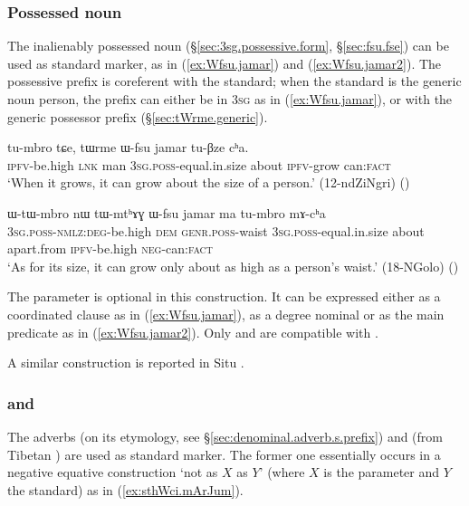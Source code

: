 \subsubsection{Possessed noun} \label{sec:Wfsu.equative}
The inalienably possessed noun   (§\ref{sec:3sg.possessive.form}, §\ref{sec:fsu.fse}) can be used as standard marker, as in (\ref{ex:Wfsu.jamar}) and (\ref{ex:Wfsu.jamar2}). The possessive prefix is coreferent with the standard; when the standard is the generic noun  {person}, the prefix can either be in \textsc{3sg} as in (\ref{ex:Wfsu.jamar}), or with the generic possessor prefix (§\ref{sec:tWrme.generic}).

\begin{exe}
\ex \label{ex:Wfsu.jamar}
\gll tu-mbro tɕe, tɯrme ɯ-fsu jamar tu-βze cʰa. \\
\textsc{ipfv}-be.high \textsc{lnk}  man \textsc{3sg}.\textsc{poss}-equal.in.size about \textsc{ipfv}-grow can:\textsc{fact} \\
\glt `When it grows, it can grow about the size of a person.' (12-ndZiNgri)
()
\end{exe}

\begin{exe}
\ex \label{ex:Wfsu.jamar2}
\gll ɯ-tɯ-mbro nɯ tɯ-mtʰɤɣ ɯ-fsu jamar ma tu-mbro mɤ-cʰa \\
\textsc{3sg}.\textsc{poss}-\textsc{nmlz}:\textsc{deg}-be.high \textsc{dem} \textsc{genr}.\textsc{poss}-waist \textsc{3sg}.\textsc{poss}-equal.in.size about apart.from \textsc{ipfv}-be.high \textsc{neg}-can:\textsc{fact} \\
\glt `As for its size, it can grow only about as high as a person's waist.' (18-NGolo)
()
\end{exe}

The parameter is optional in this construction. It can be expressed either as a coordinated clause as in (\ref{ex:Wfsu.jamar}), as a degree nominal or as the main predicate as in (\ref{ex:Wfsu.jamar2}). Only  and  are compatible with .

A similar construction is reported in Situ \citep[377]{linxr93jiarong}.

 
\subsubsection{ and } \label{sec:sthWci.equative}
The adverbs  (on its etymology, see §\ref{sec:denominal.adverb.s.prefix}) and   (from Tibetan ) are used as standard marker. The former one  essentially occurs in a negative equative construction `not as $X$ as $Y$' (where $X$ is the parameter and $Y$ the standard) as in (\ref{ex:sthWci.mArJum}).

